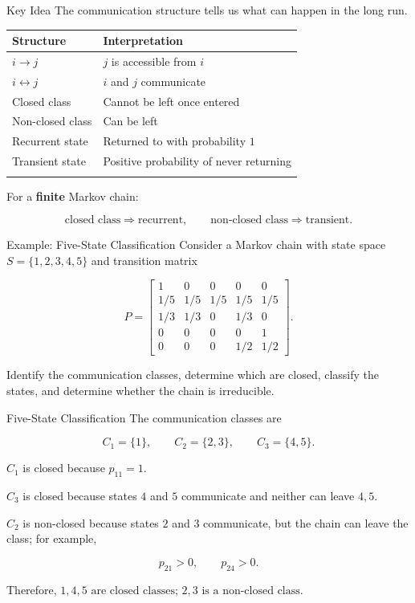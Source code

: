 \documentclass[
  ignorenonframetext,
  aspectratio=169,
]{beamer}
\newcounter{none} %
\begin{document}
\begin{frame}{Key Idea}
\protect{}\label{key-idea}
The communication structure tells us what can happen in the long run.

{\def\LTcaptype{none} %
\begin{longtable}[]{@{}ll@{}}
\toprule\noalign{}
Structure & Interpretation \\
\midrule\noalign{}
\endhead
\(i\rightarrow j\) & \(j\) is accessible from \(i\) \\
\(i\leftrightarrow j\) & \(i\) and \(j\) communicate \\
Closed class & Cannot be left once entered \\
Non-closed class & Can be left \\
Recurrent state & Returned to with probability \(1\) \\
Transient state & Positive probability of never returning \\
\bottomrule\noalign{}
\end{longtable}
}

For a \textbf{finite} Markov chain:

\[
\boxed{
\text{closed class}\Rightarrow\text{recurrent},
\qquad
\text{non-closed class}\Rightarrow\text{transient}.
}
\]
\end{frame}

\begin{frame}{Example: Five-State Classification}
\protect{}\label{example-five-state-classification}
Consider a Markov chain with state space \(S=\{1,2,3,4,5\}\) and
transition matrix

\[
P=
\begin{bmatrix}
1&0&0&0&0\\
1/5&1/5&1/5&1/5&1/5\\
1/3&1/3&0&1/3&0\\
0&0&0&0&1\\
0&0&0&1/2&1/2
\end{bmatrix}.
\]

Identify the communication classes, determine which are closed, classify
the states, and determine whether the chain is irreducible.
\end{frame}

\begin{frame}{Five-State Classification}
\protect{}\label{five-state-classification}
The communication classes are

\[
C_1=\{1\},\qquad
C_2=\{2,3\},\qquad
C_3=\{4,5\}.
\]

\(C_1\) is closed because \(p_{11}=1\).

\(C_3\) is closed because states \(4\) and \(5\) communicate and neither
can leave \({4,5}\).

\(C_2\) is non-closed because states \(2\) and \(3\) communicate, but
the chain can leave the class; for example,

\[
p_{21}>0,\qquad p_{24}>0.
\]

Therefore,
\(\boxed{{1},{4,5}\text{ are closed classes; }{2,3}\text{ is a non-closed class}.}\)
\end{frame}
\end{document}
